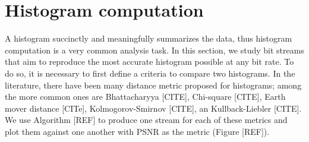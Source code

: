 
\section{Histogram computation}

A histogram succinctly and meaningfully summarizes the data, thus histogram computation is a very
common analysis task. In this section, we study bit streams that aim to reproduce the most accurate
histogram possible at any bit rate. To do so, it is necessary to first define a criteria to compare
two histograms. In the literature, there have been many distance metric proposed for histograms;
among the more common ones are Bhattacharyya [CITE], Chi-square [CITE], Earth mover distance [CITe],
Kolmogorov-Smirnov [CITE], an Kullback-Liebler [CITE]. We use Algorithm [REF] to produce one stream
for each of these metrics and plot them against one another with PSNR as the metric (Figure [REF]).


